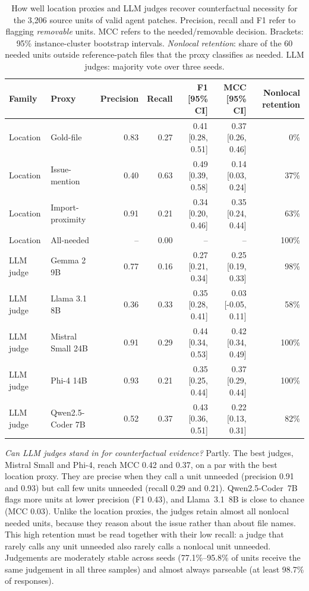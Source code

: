 \documentclass[a4paper,fleqn]{cas-sc}
\newcommand{\rqtwoFoneLqwencoderb}{0.43}
\newcommand{\rqtwoMccLllamab}{0.03}
\newcommand{\rqtwoMccLmistralsmallb}{0.42}
\newcommand{\rqtwoMccLphib}{0.37}
\newcommand{\rqtwoParseMin}{98.7\%}
\newcommand{\rqtwoPrecLmistralsmallb}{0.91}
\newcommand{\rqtwoPrecLphib}{0.93}
\newcommand{\rqtwoRecLmistralsmallb}{0.29}
\newcommand{\rqtwoRecLphib}{0.21}
\newcommand{\rqtwoSeedAgreeMax}{95.8\%}
\newcommand{\rqtwoSeedAgreeMin}{77.1\%}
\begin{document}
\begin{table}[t]
\caption{How well location proxies and LLM judges recover counterfactual necessity for the 3{,}206 source units of valid agent patches. Precision, recall and F1 refer to flagging \emph{removable} units. MCC refers to the needed/removable decision. Brackets: 95\% instance-cluster bootstrap intervals. \emph{Nonlocal retention}: share of the 60 needed units outside reference-patch files that the proxy classifies as needed. LLM judges: majority vote over three seeds.}
\label{tab:proxies}
\centering\footnotesize
\begin{tabular}{llrrrrr}
\toprule
Family & Proxy & Precision & Recall & F1 [95\% CI] & MCC [95\% CI] & Nonlocal retention \\
\midrule
Location & Gold-file & 0.83 & 0.27 & 0.41 [0.28, 0.51] & 0.37 [0.26, 0.46] & 0\% \\
Location & Issue-mention & 0.40 & 0.63 & 0.49 [0.39, 0.58] & 0.14 [0.03, 0.24] & 37\% \\
Location & Import-proximity & 0.91 & 0.21 & 0.34 [0.20, 0.46] & 0.35 [0.24, 0.44] & 63\% \\
Location & All-needed & -- & 0.00 & -- & -- & 100\% \\
\midrule
LLM judge & Gemma 2 9B & 0.77 & 0.16 & 0.27 [0.21, 0.34] & 0.25 [0.19, 0.33] & 98\% \\
LLM judge & Llama 3.1 8B & 0.36 & 0.33 & 0.35 [0.28, 0.41] & 0.03 [-0.05, 0.11] & 58\% \\
LLM judge & Mistral Small 24B & 0.91 & 0.29 & 0.44 [0.34, 0.53] & 0.42 [0.34, 0.49] & 100\% \\
LLM judge & Phi-4 14B & 0.93 & 0.21 & 0.35 [0.25, 0.44] & 0.37 [0.29, 0.44] & 100\% \\
LLM judge & Qwen2.5-Coder 7B & 0.52 & 0.37 & 0.43 [0.36, 0.51] & 0.22 [0.13, 0.31] & 82\% \\
\bottomrule
\end{tabular}
\end{table}

\emph{Can LLM judges stand in for counterfactual evidence?} Partly. The best judges, Mistral Small and Phi-4, reach MCC \rqtwoMccLmistralsmallb{} and \rqtwoMccLphib{}, on a par with the best location proxy. They are precise when they call a unit unneeded (precision \rqtwoPrecLmistralsmallb{} and \rqtwoPrecLphib{}) but call few units unneeded (recall \rqtwoRecLmistralsmallb{} and \rqtwoRecLphib{}). Qwen2.5-Coder~7B flags more units at lower precision (F1 \rqtwoFoneLqwencoderb{}), and Llama~3.1~8B is close to chance (MCC \rqtwoMccLllamab{}). Unlike the location proxies, the judges retain almost all nonlocal needed units, because they reason about the issue rather than about file names. This high retention must be read together with their low recall: a judge that rarely calls any unit unneeded also rarely calls a nonlocal unit unneeded. Judgements are moderately stable across seeds (\rqtwoSeedAgreeMin--\rqtwoSeedAgreeMax{} of units receive the same judgement in all three samples) and almost always parseable (at least \rqtwoParseMin{} of responses).
\end{document}

